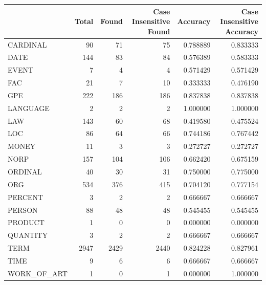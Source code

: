 \begin{tabular}{lrrrrr}
\toprule
 & Total & Found & Case Insensitive Found & Accuracy & Case Insensitive Accuracy \\
\midrule
CARDINAL & 90 & 71 & 75 & 0.788889 & 0.833333 \\
DATE & 144 & 83 & 84 & 0.576389 & 0.583333 \\
EVENT & 7 & 4 & 4 & 0.571429 & 0.571429 \\
FAC & 21 & 7 & 10 & 0.333333 & 0.476190 \\
GPE & 222 & 186 & 186 & 0.837838 & 0.837838 \\
LANGUAGE & 2 & 2 & 2 & 1.000000 & 1.000000 \\
LAW & 143 & 60 & 68 & 0.419580 & 0.475524 \\
LOC & 86 & 64 & 66 & 0.744186 & 0.767442 \\
MONEY & 11 & 3 & 3 & 0.272727 & 0.272727 \\
NORP & 157 & 104 & 106 & 0.662420 & 0.675159 \\
ORDINAL & 40 & 30 & 31 & 0.750000 & 0.775000 \\
ORG & 534 & 376 & 415 & 0.704120 & 0.777154 \\
PERCENT & 3 & 2 & 2 & 0.666667 & 0.666667 \\
PERSON & 88 & 48 & 48 & 0.545455 & 0.545455 \\
PRODUCT & 1 & 0 & 0 & 0.000000 & 0.000000 \\
QUANTITY & 3 & 2 & 2 & 0.666667 & 0.666667 \\
TERM & 2947 & 2429 & 2440 & 0.824228 & 0.827961 \\
TIME & 9 & 6 & 6 & 0.666667 & 0.666667 \\
WORK_OF_ART & 1 & 0 & 1 & 0.000000 & 1.000000 \\
\bottomrule
\end{tabular}
